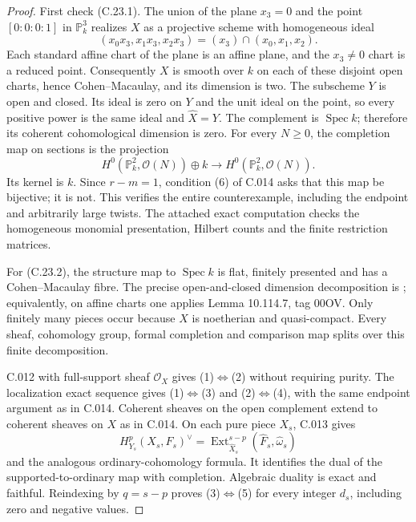 \begin{proof}
First check (C.23.1). The union of the plane $x_3=0$ and the point
$[0:0:0:1]$ in $\mathbb P_k^3$ realizes $X$ as a projective scheme
with homogeneous ideal
\[
 (x_0x_3,x_1x_3,x_2x_3)=(x_3)\cap(x_0,x_1,x_2).
\]
Each standard affine chart of the plane is an affine plane, and
the $x_3\ne0$ chart is a reduced point. Consequently $X$ is smooth
over $k$ on each of these disjoint open charts, hence
Cohen--Macaulay, and its dimension is two. The subscheme $Y$ is
open and closed. Its ideal is zero on $Y$ and the unit ideal on
the point, so every positive power is the same ideal and
$\widehat X=Y$. The complement is $\operatorname{Spec}k$;
therefore its coherent cohomological dimension is zero.
For every $N\ge0$, the completion map on sections is the projection
\[
 H^0(\mathbb P_k^2,\mathcal O(N))\oplus k
 \longrightarrow H^0(\mathbb P_k^2,\mathcal O(N)).
                                                        \tag{C.23.3}
\]
Its kernel is $k$. Since $r-m=1$, condition (6) of C.014 asks that
this map be bijective; it is not. This verifies the entire
counterexample, including the endpoint and arbitrarily large twists.
The attached exact computation checks the homogeneous monomial
presentation, Hilbert counts and the finite restriction matrices.

For (C.23.2), the structure map to $\operatorname{Spec}k$ is flat,
finitely presented and has a Cohen--Macaulay fibre. The precise
open-and-closed dimension decomposition is
\cite[Lemma 29.30.4, tag 02NM]{C-stacks}; equivalently, on affine
charts one applies Lemma 10.114.7, tag 00OV. Only finitely many
pieces occur because $X$ is noetherian and quasi-compact.
Every sheaf, cohomology group, formal completion and comparison
map splits over this finite decomposition.

C.012 with full-support sheaf $\mathcal O_X$ gives
(1)$\Longleftrightarrow$(2) without requiring purity. The
localization exact sequence gives
(1)$\Longleftrightarrow$(3) and
(2)$\Longleftrightarrow$(4), with the same endpoint argument
as in C.014. Coherent sheaves on the open complement extend to
coherent sheaves on $X$ as in C.014.
On each pure piece $X_s$, C.013 gives
\[
 H^p_{Y_s}(X_s,F_s)^\vee
 =\operatorname{Ext}^{s-p}_{\widehat X_s}
     (\widehat F_s,\widehat\omega_s)
\]
and the analogous ordinary-cohomology formula. It identifies
the dual of the supported-to-ordinary map with completion.
Algebraic duality is exact and faithful. Reindexing by
$q=s-p$ proves (3)$\Longleftrightarrow$(5) for every integer
$d_s$, including zero and negative values.


\end{proof}
